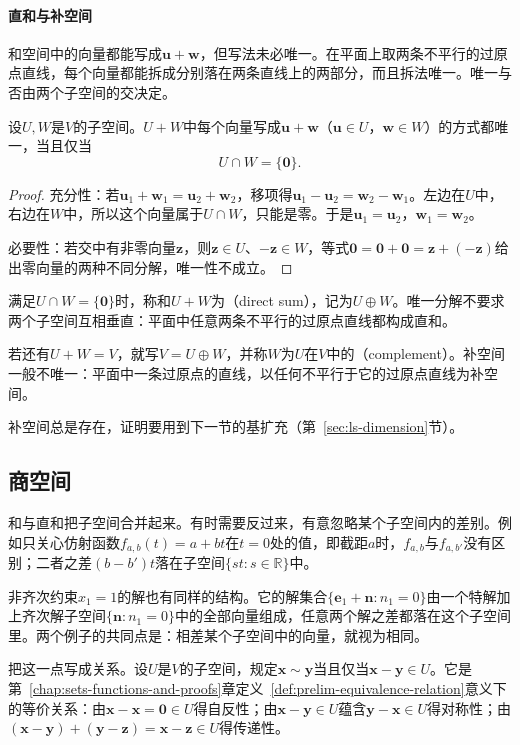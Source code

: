 \paragraph{直和与补空间}
\label{sec:ls-direct-sum}
和空间中的向量都能写成$\bm u+\bm w$，但写法未必唯一。在平面上取两条不平行的过原点直线，每个向量都能拆成分别落在两条直线上的两部分，而且拆法唯一。唯一与否由两个子空间的交决定。
\begin{theorem}[和的分解唯一的条件]
\label{thm:ls-direct-sum-uniqueness}
设$U,W$是$V$的子空间。$U+W$中每个向量写成$\bm u+\bm w$（$\bm u\in U$，$\bm w\in W$）的方式都唯一，当且仅当
\[
 U\cap W=\{\bm0\}.
\]
\end{theorem}
\begin{proof}
充分性：若$\bm u_1+\bm w_1=\bm u_2+\bm w_2$，移项得$\bm u_1-\bm u_2=\bm w_2-\bm w_1$。左边在$U$中，右边在$W$中，所以这个向量属于$U\cap W$，只能是零。于是$\bm u_1=\bm u_2$，$\bm w_1=\bm w_2$。

必要性：若交中有非零向量$\bm z$，则$\bm z\in U$、$-\bm z\in W$，等式$\bm0=\bm0+\bm0=\bm z+(-\bm z)$给出零向量的两种不同分解，唯一性不成立。
\end{proof}

满足$U\cap W=\{\bm0\}$时，称和$U+W$为（direct sum），记为$U\oplus W$。唯一分解不要求两个子空间互相垂直：平面中任意两条不平行的过原点直线都构成直和。

若还有$U+W=V$，就写$V=U\oplus W$，并称$W$为$U$在$V$中的（complement）。补空间一般不唯一：平面中一条过原点的直线，以任何不平行于它的过原点直线为补空间。

补空间总是存在，证明要用到下一节的基扩充（第~\ref{sec:ls-dimension}节）。

\subsection{商空间}
\label{sec:ls-quotient-spaces}
\label{sec:linear-algebra-equivalence-relations}
和与直和把子空间合并起来。有时需要反过来，有意忽略某个子空间内的差别。例如只关心仿射函数$f_{a,b}(t)=a+bt$在$t=0$处的值，即截距$a$时，$f_{a,b}$与$f_{a,b'}$没有区别；二者之差$(b-b')t$落在子空间$\{st:s\in\mathbb R\}$中。

非齐次约束$x_1=1$的解也有同样的结构。它的解集合$\{\bm e_1+\bm n:n_1=0\}$由一个特解加上齐次解子空间$\{\bm n:n_1=0\}$中的全部向量组成，任意两个解之差都落在这个子空间里。两个例子的共同点是：相差某个子空间中的向量，就视为相同。

把这一点写成关系。设$U$是$V$的子空间，规定$\bm x\sim\bm y$当且仅当$\bm x-\bm y\in U$。它是第~\ref{chap:sets-functions-and-proofs}章定义~\ref{def:prelim-equivalence-relation}意义下的等价关系：由$\bm x-\bm x=\bm0\in U$得自反性；由$\bm x-\bm y\in U$蕴含$\bm y-\bm x\in U$得对称性；由$(\bm x-\bm y)+(\bm y-\bm z)=\bm x-\bm z\in U$得传递性。

